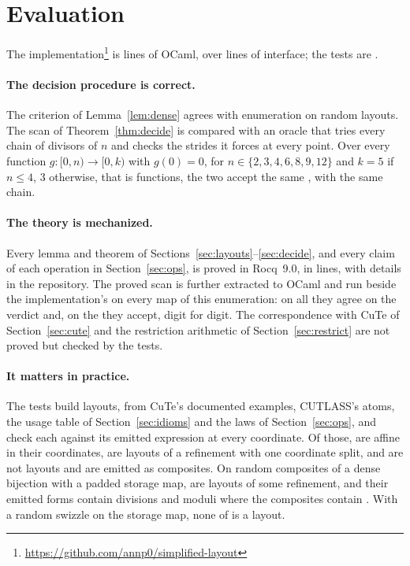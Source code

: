 \section{Evaluation}\label{sec:eval}

The implementation\footnote{\url{https://github.com/annp0/simplified-layout}}
is \evalLibLines{} lines of OCaml, over \evalLibMliLines{} lines of
interface; the tests are \evalTestLines{}. 

\paragraph{The decision procedure is correct.} The criterion of
Lemma~\ref{lem:dense} agrees with enumeration on \evalDenseRandom{} random
layouts. The scan of
Theorem~\ref{thm:decide} is compared with an oracle that tries every chain of
divisors of $n$ and checks the strides it forces at every point. Over every
function $g : [0,n) \to [0,k)$ with $g(0) = 0$, for
$n \in \{2,3,4,6,8,9,12\}$ and $k = 5$ if $n \le 4$, $3$ otherwise, that is
\evalAxisFunctions{} functions, the two accept the same \evalAxisStrided{},
with the same chain.

\paragraph{The theory is mechanized.} Every lemma and theorem of
Sections~\ref{sec:layouts}--\ref{sec:decide}, and every claim of each operation in
Section~\ref{sec:ops}, is proved in Rocq~9.0, in
\evalRocqLines{} lines, with details in the repository. The
proved scan is further extracted to OCaml and run beside the implementation's on
every map of this enumeration: on all \evalExtractedMaps{} they agree on the
verdict and, on the \evalExtractedStrided{} they accept, digit for digit. The
correspondence with CuTe of Section~\ref{sec:cute} and the restriction
arithmetic of Section~\ref{sec:restrict} are not proved but checked by the tests. 

\paragraph{It matters in practice.} The tests build \evalLayouts{} layouts,
from CuTe's documented examples, CUTLASS's atoms, the usage table of
Section~\ref{sec:idioms} and the laws of Section~\ref{sec:ops}, and check
each against its emitted expression at every coordinate. Of those,
\evalLayoutsAffine{} are affine in their coordinates, \evalLayoutsRefined{}
are layouts of a refinement with one coordinate split, and
\evalLayoutsPipeline{} are not layouts and are emitted as composites. On
\evalPairs{} random composites of a dense bijection with a padded storage
map, \evalPairsStrided{} are layouts of some refinement, and their emitted
forms contain \evalPairsOpsEmitted{} divisions and moduli where the
composites contain \evalPairsOpsPipeline{}. With a random swizzle on the
storage map, none of \evalSwizzled{} is a layout.

